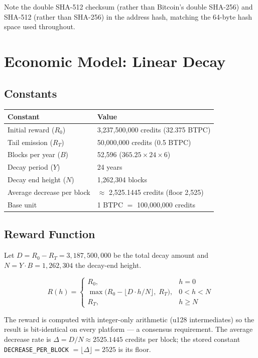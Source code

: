 \documentclass[11pt,a4paper]{article}
\begin{document}
Note the double SHA-512 checksum (rather than Bitcoin's double SHA-256) and SHA-512 (rather than SHA-256) in the address hash, matching the 64-byte hash space used throughout.

\section{Economic Model: Linear Decay}

\subsection{Constants}

\begin{center}
\begin{tabular}{ll}
\toprule
\textbf{Constant} & \textbf{Value} \\
\midrule
Initial reward ($R_0$) & 3{,}237{,}500{,}000 credits (32.375 BTPC) \\
Tail emission ($R_T$) & 50{,}000{,}000 credits (0.5 BTPC) \\
Blocks per year ($B$) & 52{,}596 ($365.25 \times 24 \times 6$) \\
Decay period ($Y$) & 24 years \\
Decay end height ($N$) & 1{,}262{,}304 blocks \\
Average decrease per block & $\approx$ 2{,}525.1445 credits (floor 2{,}525) \\
Base unit & 1 BTPC $=$ 100{,}000{,}000 credits \\
\bottomrule
\end{tabular}
\end{center}

\subsection{Reward Function}

Let $D = R_0 - R_T = 3{,}187{,}500{,}000$ be the total decay amount and $N = Y \cdot B = 1{,}262{,}304$ the decay-end height.

\[
R(h) =
\begin{cases}
R_0, & h = 0 \\
\max\bigl(R_0 - \lfloor D \cdot h / N \rfloor,\; R_T\bigr), & 0 < h < N \\
R_T, & h \ge N
\end{cases}
\]

The reward is computed with integer-only arithmetic (u128 intermediates) so the result is bit-identical on every platform --- a consensus requirement. The average decrease rate is $\Delta = D/N \approx 2525.1445$ credits per block; the stored constant \texttt{DECREASE\_PER\_BLOCK} $= \lfloor \Delta \rfloor = 2525$ is its floor.
\end{document}
